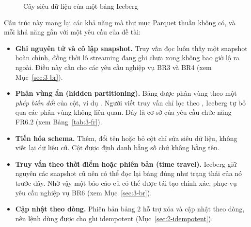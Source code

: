 \begin{figure}[H]
\centering
{}
\caption{Cây siêu dữ liệu của một bảng Iceberg}
\label{fig:2-iceberg-tree}
\end{figure}

Cấu trúc này mang lại các khả năng mà thư mục Parquet thuần không có, và mỗi khả năng gắn với một yêu cầu của đề tài:

\begin{itemize}
  \item \textbf{Ghi nguyên tử và cô lập snapshot.} Truy vấn đọc luôn thấy một snapshot hoàn chỉnh, đồng thời lô streaming đang ghi chưa xong không bao giờ lộ ra ngoài. Điều này cần cho các yêu cầu nghiệp vụ BR3 và BR4 (xem Mục~\ref{sec:3-br}).
  \item \textbf{Phân vùng ẩn (hidden partitioning).} Bảng được phân vùng theo một \emph{phép biến đổi} của cột, ví dụ . Người viết truy vấn chỉ lọc theo , Iceberg tự bỏ qua các phân vùng không liên quan. Đây là cơ sở của yêu cầu chức năng FR6.2 (xem Bảng~\ref{tab:3-fr}).
  \item \textbf{Tiến hóa schema.} Thêm, đổi tên hoặc bỏ cột chỉ sửa siêu dữ liệu, không viết lại dữ liệu cũ. Cột được định danh bằng số chứ không bằng tên.
  \item \textbf{Truy vấn theo thời điểm hoặc phiên bản (time travel).} Iceberg giữ nguyên các snapshot cũ nên có thể đọc lại bảng đúng như trạng thái của nó trước đây. Nhờ vậy một báo cáo cũ có thể được tái tạo chính xác, phục vụ yêu cầu nghiệp vụ BR6 (xem Mục~\ref{sec:3-br}).
  \item \textbf{Cập nhật theo dòng.} Phiên bản bảng 2 hỗ trợ xóa và cập nhật theo dòng, nên lệnh  dùng được cho ghi idempotent (Mục~\ref{sec:2-idempotent}).
\end{itemize}

